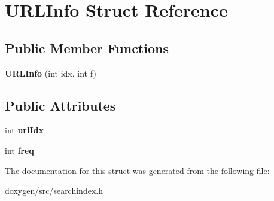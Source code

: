 \hypertarget{struct_u_r_l_info}{}\section{U\+R\+L\+Info Struct Reference}
\label{struct_u_r_l_info}
\subsection*{Public Member Functions}
\begin{DoxyCompactItemize}
\item 
\mbox{\label{struct_u_r_l_info_a0406520ff1477fa1441188ce86067782}} 
{\bfseries U\+R\+L\+Info} (int idx, int f)
\end{DoxyCompactItemize}
\subsection*{Public Attributes}
\begin{DoxyCompactItemize}
\item 
\mbox{\label{struct_u_r_l_info_a78677139b775339dc20c3bb47f2f7a03}} 
int {\bfseries url\+Idx}
\item 
\mbox{\label{struct_u_r_l_info_ab1d13a58a5c2b07d75085d5dc9f20e16}} 
int {\bfseries freq}
\end{DoxyCompactItemize}


The documentation for this struct was generated from the following file\+:\begin{DoxyCompactItemize}
\item 
doxygen/src/searchindex.\+h\end{DoxyCompactItemize}
